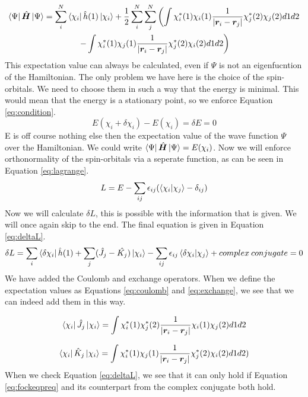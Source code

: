 \begin{multline}\label{eq:expect} 
    \bra{\Psi}\hat{\boldsymbol{H}}\ket{\Psi} = \sum_i^N\bra{\chi_i}\hat{h}(1)\ket{\chi_i} + \frac{1}{2}\sum_i^N\sum_j^N\left(\int\chi_i^*(1)\chi_i(1)\frac{1}{|\boldsymbol{r}_i- \boldsymbol{r}_j|}\chi_j^*(2)\chi_j(2)d1d2 \right.\\
     \left. - \int\chi_i^*(1)\chi_j(1)\frac{1}{|\boldsymbol{r}_i - \boldsymbol{r}_j|}\chi_j^*(2)\chi_i(2)d1d2\right)
\end{multline}
This expectation value can always be calculated, even if $\Psi$ is not an eigenfucntion
of the Hamiltonian. The only problem we have here is the choice of the spin-orbitals.
We need to choose them in such a way that the energy is minimal. This would mean
that the energy is a stationary point, so we enforce Equation \ref{eq:condition}.  
\begin{equation}\label{eq:condition}
    E(\chi_i + \delta\chi_i) - E(\chi_i) =\delta E = 0
\end{equation}
E is off course nothing else then the expectation value of the
wave function $\Psi$ over the Hamiltonian. We could write $\bra{\Psi}\hat{\boldsymbol{H}}\ket{\Psi} = E(\chi_i)$. 
Now we will enforce orthonormality of the spin-orbitals via a seperate function, as
can be seen in Equation \ref{eq:lagrange}.
\begin{equation}\label{eq:lagrange}
    L = E - \sum_{ij}\epsilon_{ij}(\braket{\chi_i}{\chi_j} - \delta_{ij})
\end{equation}
Now we will calculate $\delta L$, this is possible with the information that is given.
We will once again skip to the end. The final equation is given in Equation \ref{eq:deltaL}.
\begin{equation}\label{eq:deltaL}
    \delta L = \sum_i\bra{\delta\chi_i}\hat{h}(1) + \sum_j(\hat{J_j} - \hat{K_j})\ket{\chi_i} -  \sum_{ij}\epsilon_{ij}\braket{\delta\chi_i}{\chi_j} + complex\:conjugate = 0
\end{equation}
We have added the Coulomb and exchange operators. When we define the expectation
values as Equations \ref{eq:coulomb} and \ref{eq:exchange}, we see that we can indeed
add them in this way.

 \begin{equation}\label{eq:coulomb}
    \bra{\chi_i}\hat{J}_j\ket{\chi_i} = \int\chi_i^*(1)\chi_j^*(2)\frac{1}{|\boldsymbol{r}_i- \boldsymbol{r}_j|}\chi_i(1)\chi_j(2)d1d2
 \end{equation}

 \begin{equation}\label{eq:exchange}
     \bra{\chi_i}\hat{K}_j\ket*{\chi_i} = \int\chi_i^*(1)\chi_j(1)\frac{1}{|\boldsymbol{r}_i - \boldsymbol{r}_j|}\chi_j^*(2)\chi_i(2)d1d2)
 \end{equation}
When we check Equation \ref{eq:deltaL}, we see that it can only hold if Equation \ref{eq:fockeqpreq}
and its counterpart from the complex conjugate both hold.

